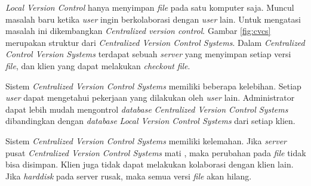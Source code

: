 \documentclass[a4paper,twoside]{article}
\begin{document}
\begin{enumerate}
\textit{Local Version Control} hanya menyimpan \textit{file} pada satu komputer saja. Muncul masalah baru ketika \textit{user} ingin berkolaborasi dengan \textit{user} lain. Untuk mengatasi masalah ini dikembangkan \textit{Centralized version control}. Gambar \ref{fig:cvcs} merupakan struktur dari \textit{Centralized Version Control Systems}. Dalam \textit{Centralized Control Version Systems} terdapat sebuah \textit{server} yang menyimpan setiap versi \textit{file}, dan klien yang dapat melakukan \textit{checkout} \textit{file}.

Sistem \textit{Centralized Version Control Systems} memiliki beberapa kelebihan. Setiap \textit{user}  dapat mengetahui pekerjaan yang dilakukan oleh \textit{user} lain. Administrator dapat lebih mudah mengontrol \textit{database} \textit{Centralized Version Control Systems} dibandingkan dengan \textit{database} \textit{Local Version Control Systems} dari setiap klien.      

Sistem \textit{Centralized Version Control Systems} memiliki kelemahan. Jika \textit{server} pusat \textit{Centralized Version Control Systems} mati , maka perubahan pada \textit{file} tidak bisa disimpan. Klien juga tidak dapat melakukan kolaborasi dengan klien lain. Jika \textit{harddisk} pada server rusak, maka semua versi \textit{file} akan hilang.  


\end{enumerate}
\end{document}

